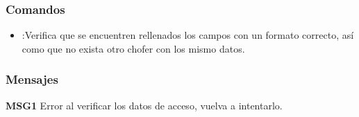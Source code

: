 \subsubsection{Comandos}
\begin{itemize}
	\item {}:Verifica que se encuentren rellenados los campos con un formato correcto, así como que no exista otro chofer con los mismo datos. 
\end{itemize}

\subsubsection{Mensajes}
	\begin{Citemize}
		\item {\bf MSG1} Error al verificar los datos de acceso, vuelva a intentarlo.
	\end{Citemize}